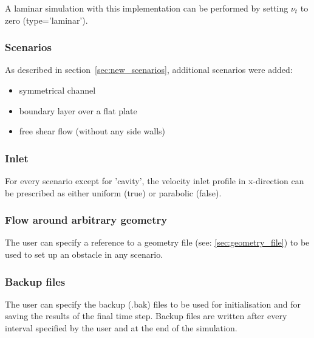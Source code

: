 
\noii A laminar simulation with this implementation can be performed by setting $\nu_t$ to zero (type='laminar').

\subsubsection*{Scenarios}

As described in section~\ref{sec:new_scenarios}, additional scenarios were added:

\begin{itemize}
\item symmetrical channel
\item boundary layer over a flat plate
\item free shear flow (without any side walls)
\end{itemize}

\subsubsection*{Inlet}

For every scenario except for 'cavity', the velocity inlet profile in x-direction can be prescribed as either uniform (true) or parabolic (false).


\subsubsection*{Flow around arbitrary geometry}

The user can specify a reference to a geometry file (see: \ref{sec:geometry_file}) to be used to set up an obstacle in any scenario.




\subsubsection*{Backup files}

The user can specify the backup (.bak) files to be used for initialisation and for saving the results of the final time step. Backup files are written after every interval specified by the user and at the end of the simulation.

